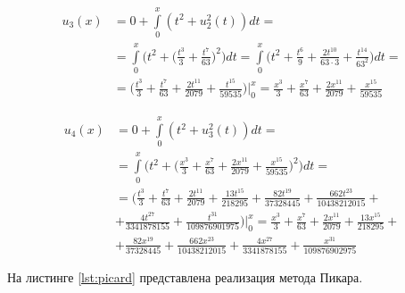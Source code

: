 \begin{equation}\label{eq:09}
    \begin{split}
        u_3(x) &= 0 + \int\limits_0^x(t^2 + u_2^2(t))dt = \\ &=
        \int\limits_0^x\bigg(t^2 + \bigg(\frac{t^3}{3} +
        \frac{t^7}{63}\bigg)^2\bigg) dt = \int\limits_0^x\bigg(t^2 +
        \frac{t^6}{9} + \frac{2t^{10}}{63 \cdot 3} + \frac{t^{14}}{63^2}\bigg) dt =
        \\ &= \bigg(\frac{t^3}{3} + \frac{t^7}{63} + \frac{2t^{11}}{2079} +
        \frac{t^{15}}{59535}\bigg)\bigg|_0^x = \frac{x^3}{3} + \frac{x^7}{63} +
        \frac{2x^{11}}{2079} + \frac{x^{15}}{59535}
    \end{split}
\end{equation}

\begin{equation}\label{eq:10}
    \begin{split}
        u_4(x) &= 0 + \int\limits_0^x(t^2 + u_3^2(t))dt = \\ &=
        \int\limits_0^x\bigg(t^2 + \bigg(\frac{x^3}{3} + \frac{x^7}{63} +
        \frac{2x^{11}}{2079} + \frac{x^{15}}{59535}\bigg)^2\bigg) dt = \\ &=
        \bigg(\frac{t^3}{3} + \frac{t^7}{63} + \frac{2t^{11}}{2079} +
        \frac{13t^{15}}{218295} +  \frac{82t^{19}}{37328445} +
        \frac{662t^{23}}{10438212015} + \\ & + \frac{4t^{27}}{3341878155} +
        \frac{t^{31}}{109876901975}\bigg)\bigg|_0^x =
        \frac{x^3}{3} + \frac{x^7}{63} + \frac{2x^{11}}{2079} +
        \frac{13x^{15}}{218295} + \\ &+ \frac{82x^{19}}{37328445} +
        \frac{662x^{23}}{10438212015} + \frac{4x^{27}}{3341878155} +
        \frac{x^{31}}{109876902975}
    \end{split}
\end{equation}


На листинге \ref{lst:picard} представлена реализация метода Пикара.





